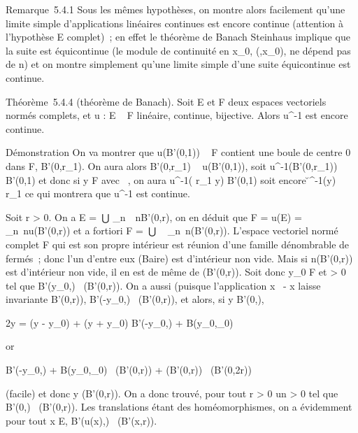 \documentclass[]{article}
\begin{document}
Remarque~5.4.1 Sous les mêmes hypothèses, on montre alors facilement
qu'une limite simple d'applications linéaires continues est encore
continue (attention à l'hypothèse E complet)~; en effet le théorème de
Banach Steinhaus implique que la suite est équicontinue (le module de
continuité en x_0, \eta(\epsilon,x_0), ne dépend pas de n) et on
montre simplement qu'une limite simple d'une suite équicontinue est
continue.

Théorème~5.4.4 (théorème de Banach). Soit E et F deux espaces vectoriels
normés complets, et u : E \rightarrow~ F linéaire, continue, bijective. Alors
u^-1 est encore continue.

Démonstration On va montrer que u(B'(0,1)) \subset~ F contient une boule de
centre 0 dans F, B'(0,r_1). On aura alors B'(0,r_1) \subset~
u(B'(0,1)), soit u^-1(B'(0,r_1)) \subset~ B'(0,1) et donc
si y \in F avec \y\ ,
on aura u^-1( r_1  y) \in
B'(0,1) soit encore
\u^-1(y)\
 \over r_1 ce qui montrera que
u^-1 est continue.

Soit r > 0. On a E =  _n\in{}~~nB'(0,r), on en déduit que F =
u(E) = \⋃ ~
_n\in{}~nu(B'(0,r)) et a fortiori F =\
⋃ ~
_n\in\mathbb{N}~n\overlineu(B'(0,r)). L'espace vectoriel
normé complet F qui est son propre intérieur est réunion d'une famille
dénombrable de fermés~; donc l'un d'entre eux (Baire) est d'intérieur
non vide. Mais si n\overlineu(B'(0,r)) est
d'intérieur non vide, il en est de même de
\overlineu(B'(0,r)). Soit donc y_0 \in F et \rho
> 0 tel que B'(y_0,\rho)
\subset~\overlineu(B'(0,r)). On a aussi (puisque
l'application x\mapsto~ - x laisse invariante
B'(0,r)), B'(-y_0,\rho) \subset~\overlineu(B'(0,r)),
et alors, si y \in B'(0,\rho),

2y = (y - y_0) + (y + y_0) \in B'(-y_0,\rho) +
B(y_0,\rho_0)

or

B'(-y_0,\rho) + B(y_0,\rho_0)
\subset~\overlineu(B'(0,r)) +
\overlineu(B'(0,r))
\subset~\overlineu(B'(0,2r))

(facile) et donc y \in\overlineu(B'(0,r)). On a donc
trouvé, pour tout r > 0 un \rho > 0 tel que
B'(0,\rho) \subset~\overlineu(B'(0,r)). Les translations étant
des homéomorphismes, on a évidemment pour tout x \in E, B'(u(x),\rho)
\subset~\overlineu(B'(x,r)).
\end{document}
